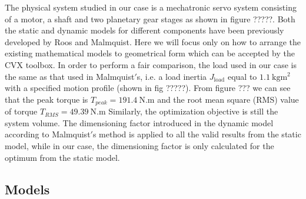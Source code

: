 The physical system studied in our case is a mechatronic servo system consisting of a motor, a shaft and two planetary gear stages as shown in figure ?????. Both the static and dynamic models for different components have been previously developed by Roos and Malmquist. Here we will focus only on how to arrange the existing mathematical models to geometrical form which can be accepted by the CVX toolbox. In order to perform a fair comparison, the load used in our case is the same as that used in Malmquist$'$s, i.e. a load inertia $J_{\text{load}}$ equal to $\SI{1.1}{\kilogram\meter\squared}$ with a specified motion profile (shown in fig ?????). From figure ??? we can see that the peak torque is $T_{peak}=\SI{191.4}{\newton.\meter}$ and the root mean square (RMS) value of torque $T_{RMS}=\SI{49.39}{\newton.\meter}$ Similarly, the optimization objective is still the system volume. The dimensioning factor introduced in the dynamic model according to Malmquist$'$s method is applied to all the valid results from the static model, while in our case, the dimensioning factor is only calculated for the optimum from the static model.

\subsection*{Models}
